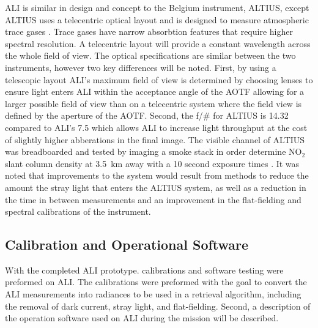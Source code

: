 \documentclass[12pt]{article}
\begin{document}
ALI is similar in design and concept to the Belgium instrument, ALTIUS, except ALTIUS uses a telecentric optical layout and is designed to measure atmospheric trace gases 
\citep{Dekemper2012}. Trace gases have narrow absorbtion features that require higher spectral resolution. A telecentric layout will provide a constant wavelength across the 
whole field of view. The optical specifications are similar between the two instruments, however two key differences will be noted. First, by using a telescopic layout ALI's 
maximum field of view is determined by choosing lenses to ensure light enters ALI within the acceptance angle of the AOTF allowing for a larger possible field of view than on a 
telecentric system where the field view is defined by the aperture of the AOTF. Second, the f/\# for ALTIUS is 14.32 compared to ALI's 7.5 which allows ALI to increase light 
throughput at the cost of slightly higher abberations in the final image. The visible channel of ALTIUS was breadboarded and tested by imaging a smoke stack in order determine 
NO$_{2}$ slant column density at 3.5~km away with a 10 second exposure times \citep{Dekemper2012}. It was noted that improvements to the system would result from methods to 
reduce the amount the stray light that enters the ALTIUS system, as well as a reduction in the time in between measurements and an improvement in the flat-fielding and spectral 
calibrations of the instrument.

\subsection{Calibration and Operational Software}
\label{sec:Calibration}

With the completed ALI prototype. calibrations and software testing were preformed on ALI. The calibrations were preformed with the goal to convert the ALI measurements into 
radiances to be used in a retrieval algorithm, including the removal of dark current, stray light, and flat-fielding. Second, a description of the operation software used on ALI 
during the mission will be described.
\end{document}
